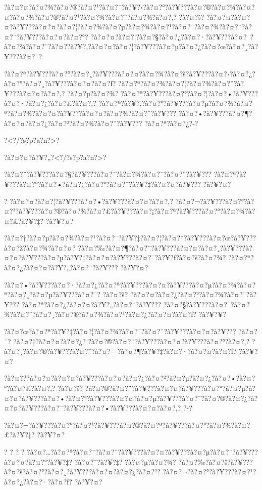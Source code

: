 \documentclass[11pt, openany]{book}
\begin{document}
{{{{{{{{{{?à?¤?¤?à?¤?¾?à?¤?®?à?¤?¹?à?¤?¯?à?¥?‹?à?¤?°?à?¥???à?¤?®?à?¤?¾?à?¤?¤?à?¤?¾?à?¤?®?à?¤?¹?à?¤?¾?à?¤?¨?à?¤?¾?à?¤?‚?
?à?¤?š?
?à?¤?¤?à?¤?¤?à?¥???à?¤?¤?à?¤?¦?à?¤?¾?à?¤?µ?à?¤?¾?à?¤?¹?à?¤?¨?à?¤?¾?à?¤?¨?à?¤?¨?à?¥???à?¤?¤?à?¤?°?
?à?¤?¤?à?¤?¦?à?¤?§?à?¤?¿?à?¤?·?à?¥???à?¤?~?à?¤?¾?à?¤?¨?à?¤?­?à?¥?‚?à?¤?¤?à?¤?¦?à?¥???à?¤?µ?à?¤?¿?à?¤?œ?à?¤?¸?à?¥???à?¤?¯?

?à?¤?ª?à?¥???à?¤?°?à?¤?¸?à?¥???à?¤?¤?à?¤?¾?à?¤?š?à?¥???à?¤?›?à?¤?¿?à?¤?°?à?¤?¸?à?¥???à?¤?¤?à?¤?ƒ?
?à?¤?ª?à?¤?¾?à?¤?¦?à?¤?¾?à?¤?¨?à?¥???à?¤?¤?à?¤?‚? ?à?¤?µ?à?¤?¾?
?à?¤?ª?à?¥???à?¤?°?à?¤?¦?à?¤?•?à?¥???à?¤?·?à?¤?¿?à?¤?£?à?¤?‚?
?à?¤?ª?à?¥?‚?à?¤?°?à?¥???à?¤?µ?à?¤?¾?à?¤?ª?à?¤?¾?à?¤?¤?à?¥???à?¤?¤?à?¤?¾?à?¤?¨?à?¥???
?à?¤?•?à?¥???à?¤?¶?à?¤?¤?à?¤?¿?à?¤?²?à?¤?¾?à?¤?¨?à?¥??? ?à?¤?ª?à?¤?¿?-?

?\textless{}?/?s?p?a?n?\textgreater{}?

?à?¤?¤?à?¥?„?\textless{}?/?s?p?a?n?\textgreater{}?

?à?¤?¨?à?¥???à?¤?§?à?¥???à?¤?¯?à?¤?¾?à?¤?¯?à?¤?¨?à?¥???
?à?¤?ª?à?¥???à?¤?°?à?¤?•?à?¤?¿?à?¤?°?à?¤?¯?à?¥?‡?à?¤?¤?à?¥??? ?à?¥?¤?

? ?à?¤?¤?à?¤?¦?à?¥???à?¤?•?à?¥???à?¤?¤?à?¤?‚?
?à?¤?¬?à?¥???à?¤?°?à?¤?¹?à?¥???à?¤?®?à?¤?¾?à?¤?£?à?¥???à?¤?¡?à?¤?ª?à?¥???à?¤?°?à?¤?¾?à?¤?£?à?¥?‡?
?à?¥?¤?

?à?¤?†?à?¤?µ?à?¤?¾?à?¤?¹?à?¤?¯?à?¥?‡?à?¤?¦?à?¤?¨?à?¥???à?¤?œ?à?¥???à?¤?ž?à?¤?¾?à?¤?¤?
?à?¤?‰?à?¤?¶?à?¤?¨?à?¥???à?¤?¤?à?¤?¸?à?¥???à?¤?¤?à?¥???à?¤?µ?à?¥?‡?à?¤?¤?à?¥???à?¤?¯?à?¥?ƒ?à?¤?š?à?¤?¾?
?à?¤?ª?à?¤?¿?à?¤?¤?à?¥?„?à?¤?¨?à?¥??? ?à?¥?¤?

?à?¤?•?à?¥???à?¤?·?à?¤?¿?à?¤?ª?à?¥???à?¤?¤?à?¥???à?¤?µ?à?¤?¾?à?¤?ª?à?¤?¸?à?¤?µ?à?¥???à?¤?¯?
?à?¤?š? ?à?¤?¤?à?¤?¿?à?¤?²?à?¤?¾?à?¤?¨?à?¥???
?à?¤?ª?à?¤?¿?à?¤?¤?à?¥?„?à?¤?¨?à?¥???
?à?¤?§?à?¥???à?¤?¯?à?¤?¾?à?¤?¨?à?¤?¸?à?¤?®?à?¤?¾?à?¤?¹?à?¤?¿?à?¤?¤?à?¤?ƒ?
?à?¥?¥?

?à?¤?œ?à?¤?ª?à?¥?‡?à?¤?¦?à?¤?¾?à?¤?¯?à?¤?¨?à?¥???à?¤?¤?à?¥??? ?à?¤?¨?
?à?¤?‡?à?¤?¤?à?¤?¿? ?à?¤?®?à?¤?¨?à?¥???à?¤?¤?à?¥???à?¤?°?à?¤?‚?
?à?¤?¸?à?¤?®?à?¥???à?¤?¯?à?¤?---?à?¤?¶?à?¥?‡?à?¤?·?à?¤?¤?à?¤?ƒ? ?à?¥?¤?

?à?¤???à?¤?¤?à?¤?¤?à?¥???à?¤?¤?à?¤?¿?à?¤?²?à?¤?µ?à?¤?¿?à?¤?•?à?¤?°?à?¤?£?à?¤?‚?
?à?¤?š?
?à?¤?®?à?¤?¨?à?¥???à?¤?¤?à?¥???à?¤?°?à?¤?µ?à?¤?¤?à?¥???à?¤?•?à?¤?°?à?¥???à?¤?¤?à?¤?µ?à?¥???à?¤?¯?à?¤?®?à?¤?¿?à?¤?¤?à?¥???à?¤?¯?à?¥???à?¤?•?à?¥???à?¤?¤?à?¤?‚?
?-?

?à?¤?¬?à?¥???à?¤?°?à?¤?¹?à?¥???à?¤?®?à?¤?ª?à?¥???à?¤?°?à?¤?¾?à?¤?£?à?¥?‡?
?à?¥?¤?

? ? ? ?
?à?¤?\ldots{}?à?¤?ª?à?¤?¯?à?¤?¨?à?¥???à?¤?¤?à?¥???à?¤?µ?à?¤?¨?à?¥???à?¤?¤?à?¤?°?à?¥?‡?
?à?¤?¯?à?¥?‡? ?à?¤?µ?à?¤?¾?
?à?¤?‰?à?¤?š?à?¥???à?¤?š?à?¤?°?à?¤?¸?à?¥???à?¤?¤?à?¤?¿?à?¤?²?
?à?¤?¬?à?¤?°?à?¥???à?¤?¹?à?¤?¿?à?¤?·?à?¤?ƒ? ?à?¥?¤?

}}}}}}}}}}
\end{document}
